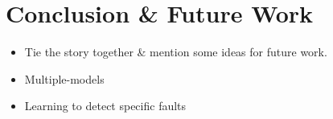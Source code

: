 \documentclass[11pt, a4paper]{report}
\begin{document}
\chapter{Conclusion \& Future Work}
\label{cha:conclusion}

\begin{itemize}
\item Tie the story together \& mention some ideas for future
  work.
\item Multiple-models
\item Learning to detect specific faults
\end{itemize}


% 
% 
% 
% 
% 
% 
% 
% 


\end{document}
